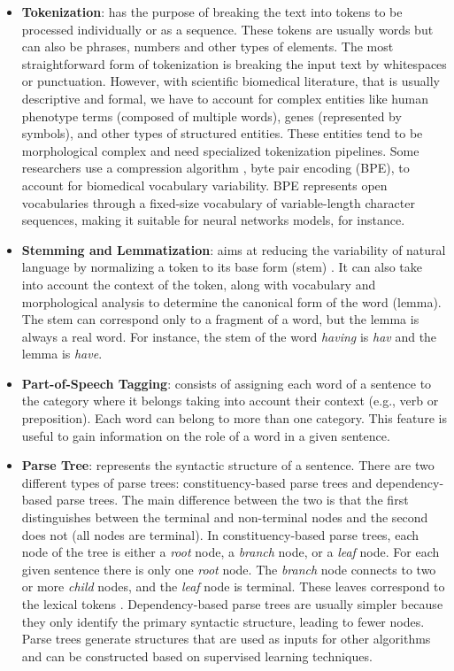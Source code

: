 \begin{itemize}

\item{\textbf{Tokenization}: has the purpose of breaking the text into tokens to be processed individually or as a sequence. These tokens are usually words but can also be phrases, numbers and other types of elements. The most straightforward form of tokenization is breaking the input text by whitespaces or punctuation. However, with scientific biomedical literature, that is usually descriptive and formal, we have to account for complex entities like human phenotype terms (composed of multiple words),  genes (represented by symbols), and other types of structured entities. These entities tend to be morphological complex and need specialized tokenization pipelines. Some researchers use a compression algorithm \citep{DBLP:journals/corr/SennrichHB15}, byte pair encoding (BPE), to account for biomedical vocabulary variability. BPE represents open vocabularies through a fixed-size vocabulary of variable-length character sequences, making it suitable for neural networks models, for instance.} 

\item{\textbf{Stemming and Lemmatization}: aims at reducing the variability of natural language by normalizing a token to its base form (stem) \citep{Manning:2008:IIR:1394399}. It can also take into account the context of the token, along with vocabulary and morphological analysis to determine the canonical form of the word (lemma). The stem can correspond only to a fragment of a word, but the lemma is always a real word. For instance, the stem of the word \textit{having} is \textit{hav} and the lemma is \textit{have}.}

\item{\textbf{Part-of-Speech Tagging}: consists of assigning each word of a sentence to the category where it belongs taking into account their context (e.g., verb or preposition). Each word can belong to more than one category. This feature is useful to gain information on the role of a word in a given sentence.}

\item{\textbf{Parse Tree}: represents the syntactic structure of a sentence. There are two different types of parse trees: constituency-based parse trees and dependency-based parse trees. The main difference between the two is that the first distinguishes between the terminal and non-terminal nodes and the second does not (all nodes are terminal). In constituency-based parse trees, each node of the tree is either a \textit{root} node, a \textit{branch} node, or a \textit{leaf} node. For each given sentence there is only one \textit{root} node. The \textit{branch} node connects to two or more \textit{child} nodes, and the \textit{leaf} node is terminal. These leaves correspond to the lexical tokens \citep{AHO}. Dependency-based parse trees are usually simpler because they only identify the primary syntactic structure, leading to fewer nodes. Parse trees generate structures that are used as inputs for other algorithms and can be constructed based on supervised learning techniques.}

\end{itemize}

